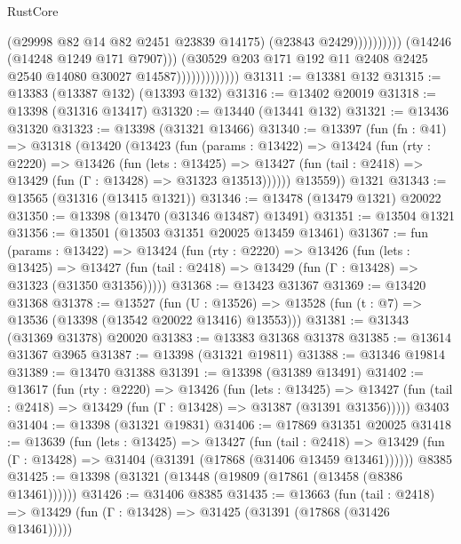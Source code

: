 \begin{lexlean}{RustCore}
\begin{coremodule}
                                                (@29998 @82 @14 @82 @2451 @23839 @14175)
                                                (@23843 @2429))))))))))
                              (@14246 (@14248 @1249 @171 @7907)))
                            (@30529
                              @203
                              @171
                              @192
                              @11
                              @2408
                              @2425
                              @2540
                              @14080
                              @30027
                              @14587)))))))))))))
@31311 := @13381 @132
@31315 := @13383 (@13387 @132) (@13393 @132)
@31316 := @13402 @20019
@31318 := @13398 (@31316 @13417)
@31320 := @13440 (@13441 @132)
@31321 := @13436 @31320
@31323 := @13398 (@31321 @13466)
@31340 := @13397
    (fun (fn : @41) =>
    @31318
      (@13420
        (@13423
          (fun (params : @13422) =>
          @13424
            (fun (rty : @2220) =>
            @13426
              (fun (lets : @13425) =>
              @13427 (fun (tail : @2418) => @13429 (fun (Γ : @13428) => @31323 @13513))))))
        @13559))
    @1321
@31343 := @13565 (@31316 (@13415 @1321))
@31346 := @13478 (@13479 @1321) @20022
@31350 := @13398 (@13470 (@31346 @13487) @13491)
@31351 := @13504 @1321
@31356 := @13501 (@13503 @31351 @20025 @13459 @13461)
@31367 := fun (params : @13422) =>
  @13424
    (fun (rty : @2220) =>
    @13426
      (fun (lets : @13425) =>
      @13427 (fun (tail : @2418) => @13429 (fun (Γ : @13428) => @31323 (@31350 @31356)))))
@31368 := @13423 @31367
@31369 := @13420 @31368
@31378 := @13527
    (fun (U : @13526) => @13528 (fun (t : @7) => @13536 (@13398 (@13542 @20022 @13416) @13553)))
@31381 := @31343 (@31369 @31378) @20020
@31383 := @13383 @31368 @31378
@31385 := @13614 @31367 @3965
@31387 := @13398 (@31321 @19811)
@31388 := @31346 @19814
@31389 := @13470 @31388
@31391 := @13398 (@31389 @13491)
@31402 := @13617
    (fun (rty : @2220) =>
    @13426
      (fun (lets : @13425) =>
      @13427 (fun (tail : @2418) => @13429 (fun (Γ : @13428) => @31387 (@31391 @31356)))))
    @3403
@31404 := @13398 (@31321 @19831)
@31406 := @17869 @31351 @20025
@31418 := @13639
    (fun (lets : @13425) =>
    @13427
      (fun (tail : @2418) =>
      @13429 (fun (Γ : @13428) => @31404 (@31391 (@17868 (@31406 @13459 @13461))))))
    @8385
@31425 := @13398 (@31321 (@13448 (@19809 (@17861 (@13458 (@8386 @13461))))))
@31426 := @31406 @8385
@31435 := @13663
    (fun (tail : @2418) => @13429 (fun (Γ : @13428) => @31425 (@31391 (@17868 (@31426 @13461)))))

\end{coremodule}
\end{lexlean}
